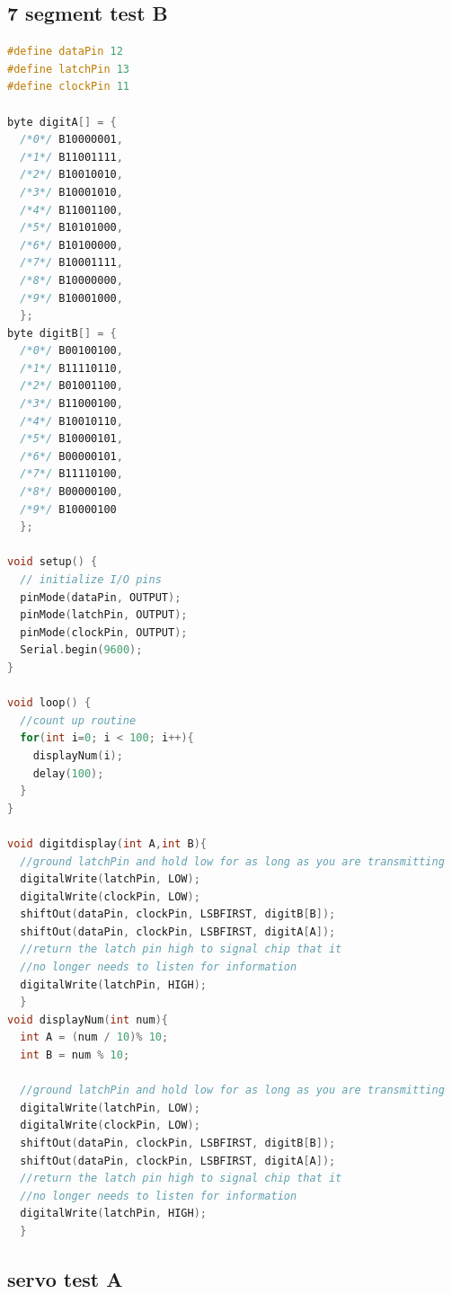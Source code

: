 \subsection*{7 segment test B}

  \begin{lstlisting}[language=c,caption={7 segment testing code B},label={lst:7seg_test_b}]
#define dataPin 12
#define latchPin 13
#define clockPin 11

byte digitA[] = {
  /*0*/ B10000001,
  /*1*/ B11001111,
  /*2*/ B10010010,
  /*3*/ B10001010,
  /*4*/ B11001100,
  /*5*/ B10101000,
  /*6*/ B10100000,
  /*7*/ B10001111,
  /*8*/ B10000000,
  /*9*/ B10001000,
  };
byte digitB[] = {
  /*0*/ B00100100,
  /*1*/ B11110110,
  /*2*/ B01001100,
  /*3*/ B11000100,
  /*4*/ B10010110,
  /*5*/ B10000101,
  /*6*/ B00000101,
  /*7*/ B11110100,
  /*8*/ B00000100,
  /*9*/ B10000100
  };

void setup() {
  // initialize I/O pins
  pinMode(dataPin, OUTPUT);
  pinMode(latchPin, OUTPUT);
  pinMode(clockPin, OUTPUT);
  Serial.begin(9600);
}

void loop() {
  //count up routine
  for(int i=0; i < 100; i++){
    displayNum(i);
    delay(100);
  }
}

void digitdisplay(int A,int B){
  //ground latchPin and hold low for as long as you are transmitting
  digitalWrite(latchPin, LOW);
  digitalWrite(clockPin, LOW);
  shiftOut(dataPin, clockPin, LSBFIRST, digitB[B]);
  shiftOut(dataPin, clockPin, LSBFIRST, digitA[A]);
  //return the latch pin high to signal chip that it
  //no longer needs to listen for information
  digitalWrite(latchPin, HIGH);
  }
void displayNum(int num){
  int A = (num / 10)% 10; 
  int B = num % 10;

  //ground latchPin and hold low for as long as you are transmitting
  digitalWrite(latchPin, LOW);
  digitalWrite(clockPin, LOW);
  shiftOut(dataPin, clockPin, LSBFIRST, digitB[B]);
  shiftOut(dataPin, clockPin, LSBFIRST, digitA[A]);
  //return the latch pin high to signal chip that it
  //no longer needs to listen for information
  digitalWrite(latchPin, HIGH);
  }
\end{lstlisting}

\subsection*{servo test A}


